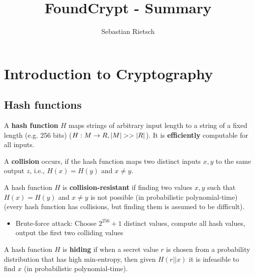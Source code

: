 \documentclass{scrartcl}
\title{FoundCrypt - Summary}
\author{Sebastian Rietsch}
\DeclarePairedDelimiter\abs{\lvert}{\rvert}%
\begin{document}
\maketitle

\section{Introduction to Cryptography}
\subsection{Hash functions}
A \textbf{hash function} \(H\) maps strings of arbitrary input length to a string of a fixed length (e.g. 256 bits) (\(H: M \rightarrow R, \abs{M} >> \abs{R}\)).
It is \textbf{efficiently} computable for all inputs.

A \textbf{collision} occurs, if the hash function maps two distinct inputs \(x,y\) to the same output \(z\), i.e., \(H(x) = H(y)\) and \(x \neq y\).

A hash function \(H\) is \textbf{collision-resistant} if finding two values \(x,y\) such that \(H(x) = H(y)\) and \(x \neq y\) is not possible (in probabilistic polynomial-time) (every hash function has collisions, but finding them is assumed to be difficult).
\begin{itemize}
    \item
        Brute-force attack: Choose \(2^{256}+1\) distinct values, compute all hash values, output the first two colliding values
\end{itemize}

A hash function \(H\) is \textbf{hiding} if when a secret value \(r\) is chosen from a probability distribution that has high min-entropy, then given \(H(r || x)\) it is infeasible to find \(x\) (in probabilistic polynomial-time).
\end{document}
